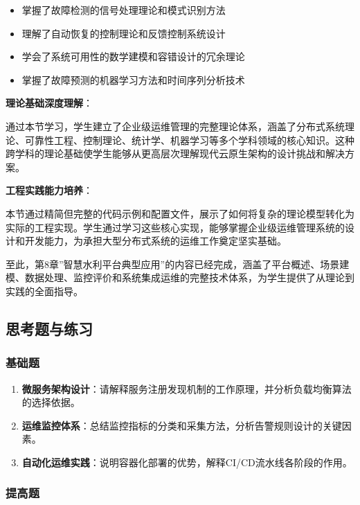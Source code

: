 \begin{enumerate}
  \begin{itemize}
  \tightlist
  \item
    掌握了故障检测的信号处理理论和模式识别方法
  \item
    理解了自动恢复的控制理论和反馈控制系统设计
  \item
    学会了系统可用性的数学建模和容错设计的冗余理论
  \item
    掌握了故障预测的机器学习方法和时间序列分析技术
  \end{itemize}
\end{enumerate}

\textbf{理论基础深度理解}：

通过本节学习，学生建立了企业级运维管理的完整理论体系，涵盖了分布式系统理论、可靠性工程、控制理论、统计学、机器学习等多个学科领域的核心知识。这种跨学科的理论基础使学生能够从更高层次理解现代云原生架构的设计挑战和解决方案。

\textbf{工程实践能力培养}：

本节通过精简但完整的代码示例和配置文件，展示了如何将复杂的理论模型转化为实际的工程实现。学生通过学习这些核心实现，能够掌握企业级运维管理系统的设计和开发能力，为承担大型分布式系统的运维工作奠定坚实基础。

至此，第8章''智慧水利平台典型应用''的内容已经完成，涵盖了平台概述、场景建模、数据处理、监控评价和系统集成运维的完整技术体系，为学生提供了从理论到实践的全面指导。

\subsection{思考题与练习}\label{ux601dux8003ux9898ux4e0eux7ec3ux4e60}

\subsubsection{基础题}\label{ux57faux7840ux9898}

\begin{enumerate}
\def\labelenumi{\arabic{enumi}.}
\tightlist
\item
  \textbf{微服务架构设计}：请解释服务注册发现机制的工作原理，并分析负载均衡算法的选择依据。
\item
  \textbf{运维监控体系}：总结监控指标的分类和采集方法，分析告警规则设计的关键因素。
\item
  \textbf{自动化运维实践}：说明容器化部署的优势，解释CI/CD流水线各阶段的作用。
\end{enumerate}

\subsubsection{提高题}\label{ux63d0ux9ad8ux9898}

